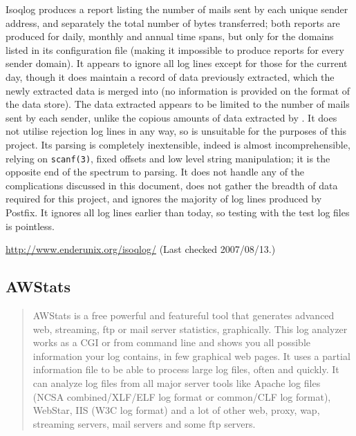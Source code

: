 Isoqlog produces a report listing the number of mails sent by each unique
sender address, and separately the total number of bytes transferred; both
reports are produced for daily, monthly and annual time spans, but only for
the domains listed in its configuration file (making it impossible to
produce reports for every sender domain).  It appears to ignore all log
lines except for those for the current day, though it does maintain a
record of data previously extracted, which the newly extracted data is
merged into (no information is provided on the format of the data store).
The data extracted appears to be limited to the number of mails sent by
each sender, unlike the copious amounts of data extracted by \parsername{}.
It does not utilise rejection log lines in any way, so is unsuitable for
the purposes of this project.  Its parsing is completely inextensible,
indeed is almost incomprehensible, relying on \texttt{scanf(3)}, fixed
offsets and low level string manipulation; it is the opposite end of the
spectrum to \parsernames{} parsing.  It does not handle any of the
complications discussed in this document, does not gather the breadth of
data required for this project, and ignores the majority of log lines
produced by Postfix.  It ignores all log lines earlier than today, so
testing with the test log files is pointless.

\url{http://www.enderunix.org/isoqlog/} \newline (Last checked 2007/08/13.)

\subsection{AWStats}

\begin{quotation}

    AWStats is a free powerful and featureful tool that generates advanced
    web, streaming, ftp or mail server statistics, graphically. This log
    analyzer works as a CGI or from command line and shows you all possible
    information your log contains, in few graphical web pages. It uses a
    partial information file to be able to process large log files, often
    and quickly. It can analyze log files from all major server tools like
    Apache log files (NCSA combined/XLF/ELF log format or common/CLF log
    format), WebStar, IIS (W3C log format) and a lot of other web, proxy,
    wap, streaming servers, mail servers and some ftp servers.

\end{quotation}

